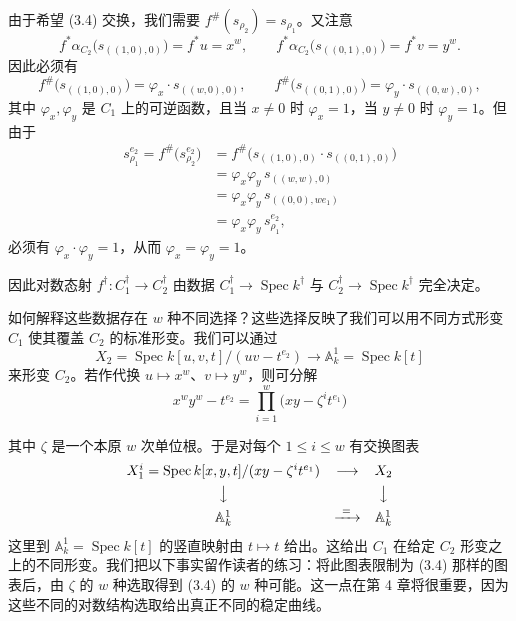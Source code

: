 \begin{example}
由于希望 (3.4) 交换，我们需要 $f^{\#}(s_{\rho_2})=s_{\rho_1}$。又注意
\[
  f^{*}\alpha_{C_2}\bigl(s_{((1,0),0)}\bigr)=f^{*}u=x^w,\qquad
  f^{*}\alpha_{C_2}\bigl(s_{((0,1),0)}\bigr)=f^{*}v=y^w.
\]
因此必须有
\[
  f^{\#}\bigl(s_{((1,0),0)}\bigr)=\varphi_x\cdot s_{((w,0),0)},\qquad
  f^{\#}\bigl(s_{((0,1),0)}\bigr)=\varphi_y\cdot s_{((0,w),0)},
\]
其中 $\varphi_x,\varphi_y$ 是 $C_1$ 上的可逆函数，且当 $x\neq0$ 时 $\varphi_x=1$，当 $y\neq0$ 时 $\varphi_y=1$。但由于
\begin{align*}
  s_{\rho_1}^{e_2}=f^{\#}\bigl(s_{\rho_2}^{e_2}\bigr)
  &=f^{\#}\bigl(s_{((1,0),0)}\cdot s_{((0,1),0)}\bigr)\\
  &=\varphi_x\varphi_y\,s_{((w,w),0)}\\
  &=\varphi_x\varphi_y\,s_{((0,0),we_1)}\\
  &=\varphi_x\varphi_y\,s_{\rho_1}^{e_2},
\end{align*}
必须有 $\varphi_x\cdot\varphi_y=1$，从而 $\varphi_x=\varphi_y=1$。

因此对数态射 $f^{\dagger}:C_1^{\dagger}\to C_2^{\dagger}$ 由数据 $C_1^{\dagger}\to\operatorname{Spec} k^{\dagger}$ 与 $C_2^{\dagger}\to\operatorname{Spec} k^{\dagger}$ 完全决定。

如何解释这些数据存在 $w$ 种不同选择？这些选择反映了我们可以用不同方式形变 $C_1$ 使其覆盖 $C_2$ 的标准形变。我们可以通过
\[
  X_2=\operatorname{Spec} k[u,v,t]/(uv-t^{e_2})\longrightarrow
  \mathbb{A}^1_k=\operatorname{Spec} k[t]
\]
来形变 $C_2$。若作代换 $u\mapsto x^w$、$v\mapsto y^w$，则可分解
\[
  x^w y^w-t^{e_2}=\prod_{i=1}^{w}\bigl(xy-\zeta^i t^{e_1}\bigr)
\]

其中 $\zeta$ 是一个本原 $w$ 次单位根。于是对每个 $1\le i\le w$ 有交换图表
\[
\begin{array}{ccc}
  X_1^i=\operatorname{Spec} k[x,y,t]/(xy-\zeta^i t^{e_1}) & \longrightarrow & X_2\\[4pt]
  \big\downarrow & & \big\downarrow\\[4pt]
  \mathbb{A}^1_k & \xrightarrow{\ =\ } & \mathbb{A}^1_k
\end{array}
\]
这里到 $\mathbb{A}^1_k=\operatorname{Spec} k[t]$ 的竖直映射由 $t\mapsto t$ 给出。这给出 $C_1$ 在给定 $C_2$ 形变之上的不同形变。我们把以下事实留作读者的练习：将此图表限制为 (3.4) 那样的图表后，由 $\zeta$ 的 $w$ 种选取得到 (3.4) 的 $w$ 种可能。这一点在第 4 章将很重要，因为这些不同的对数结构选取给出真正不同的稳定曲线。
\end{example}


